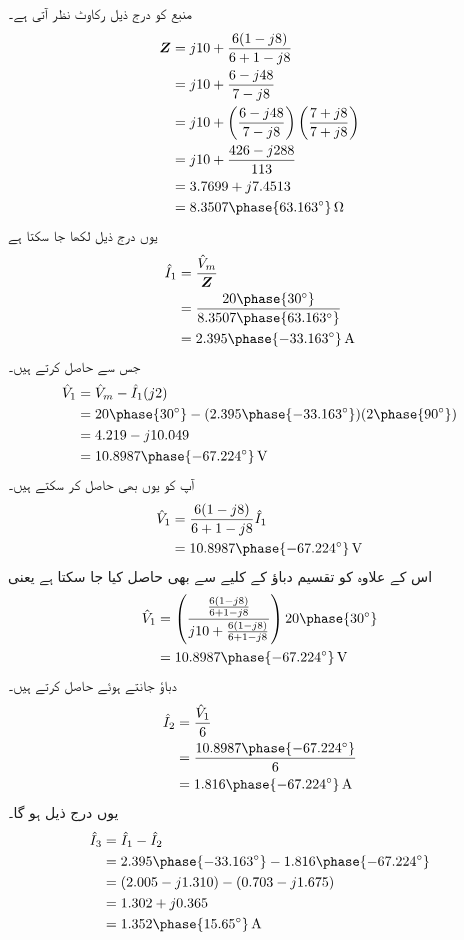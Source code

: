 منبع کو درج ذیل رکاوٹ نظر آتی ہے۔
\begin{align*}
\bZ&=j10+\frac{6(1-j8)}{6+1-j8}\\
&=j10 +\frac{6-j48}{7-j8}\\
&=j10 +\left(\frac{6-j48}{7-j8}\right)\left(\frac{7+j8}{7+j8}\right)\\
&=j10+\frac{426-j288}{113}\\
&=3.7699+j7.4513\\
&=8.3507\phase{63.163^{\circ}}\,\si{\ohm}
\end{align*}
یوں درج ذیل لکھا جا سکتا ہے
\begin{align*}
\hat{I}_1&=\frac{\hat{V}_m}{\bZ}\\
&=\frac{20\phase{30^{\circ}}}{8.3507\phase{63.163^{\circ}}}\\
&=2.395\phase{-33.163^{\circ}}\, \si{\ampere}
\end{align*}
جس سے  حاصل کرتے ہیں۔
\begin{align*}
\hat{V}_1&=\hat{V}_m-\hat{I}_1 (j2)\\
&=20\phase{30^{\circ}}-(2.395\phase{-33.163^{\circ}})( 2\phase{90^{\circ}})\\
&=4.219-j10.049\\
&=10.8987\phase{-67.224^{\circ}}\,\si{\volt}
\end{align*}
آپ  کو یوں بھی حاصل کر سکتے ہیں۔
\begin{align*}
\hat{V}_1&=\frac{6(1-j8)}{6+1-j8} \hat{I}_1\\
&=10.8987\phase{-67.224^{\circ}}\,\si{\volt}
\end{align*}
اس کے علاوہ  کو تقسیم دباؤ کے کلیے سے بھی حاصل کیا جا سکتا ہے یعنی
\begin{align*}
\hat{V}_1&=\left(\frac{\frac{6(1-j8)}{6+1-j8}}{j10+\frac{6(1-j8)}{6+1-j8}}\right) 20\phase{30^{\circ}}\\
&=10.8987\phase{-67.224^{\circ}}\,\si{\volt}
\end{align*}
دباؤ  جانتے ہوئے  حاصل کرتے ہیں۔
\begin{align*}
\hat{I}_2&=\frac{\hat{V}_1}{6}\\
&=\frac{10.8987\phase{-67.224^{\circ}}}{6}\\
&=1.816\phase{-67.224^{\circ}}\,\si{\ampere}
\end{align*}
یوں  درج ذیل ہو گا۔
\begin{align*}
\hat{I}_3 &=\hat{I}_1-\hat{I}_2\\
&=2.395\phase{-33.163^{\circ}}-1.816\phase{-67.224^{\circ}}\\
&=(2.005-j1.310)-(0.703-j1.675)\\
&=1.302+j0.365\\
&=1.352\phase{15.65^{\circ}}\,\si{\ampere}
\end{align*}
